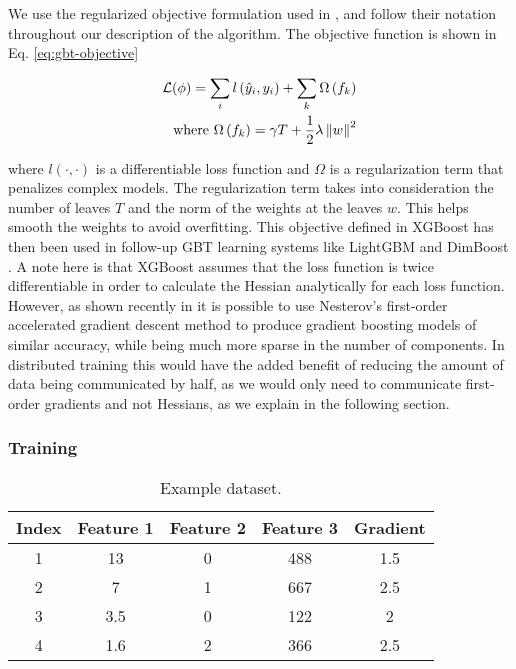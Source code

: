 We use the
regularized objective formulation used
in \cite{xgboost}, and follow their notation throughout our description of the algorithm.
The objective function is shown in Eq. \ref{eq:gbt-objective}

\begin{equation}
	\begin{split}
	\mathcal{L}(\phi) = \sum_{i} l\left(\hat{y}_{i},y_{i}\right) + \sum_{k} \Omega\left(f_{k}\right) \\
	\text{where } \Omega\left(f_{k}\right) = \gamma T + \frac{1}{2} \lambda \left\lVert w\right\rVert^2
	\end{split}
	\label{eq:gbt-objective}
\end{equation}

\noindent
where $l(\cdot, \cdot)$ is a differentiable loss function and $\Omega$ is a regularization term
that penalizes complex models. The regularization term takes into consideration
the number of leaves $T$ and the norm of the weights at the leaves $w$. This helps
smooth the weights to avoid overfitting. This objective defined in XGBoost
has then been used in follow-up GBT learning systems like LightGBM and
DimBoost \cite{lightgbm, dimboost}.  A note here is that XGBoost
assumes that the loss function is twice differentiable in order
to calculate the Hessian analytically for each loss function.
However, as shown recently in \cite{accelerated-gb} it is possible
to use Nesterov's first-order accelerated gradient descent method
\cite{nesterov-book} to produce gradient boosting models of similar
accuracy, while being much more sparse in the number of components.
In distributed training this would have the added benefit of reducing
the amount of data being communicated by half, as we would only need to
communicate first-order gradients and not Hessians, as we explain
in the following section.



\subsubsection*{Training}

\begin{table}
	\centering
	\begin{tabular}{cccc|c}
		\toprule
		Index & Feature 1 & Feature 2 & Feature 3 & Gradient \\
		\midrule
		\rowcolor{CBOne}
		1 & 13 & 0 & 488 & 1.5 \\
		\rowcolor{CBTwo}
		2 & 7 & 1 & 667 & 2.5 \\
		\rowcolor{CBThree}
		3 & 3.5 & 0 & 122 & 2 \\
		\rowcolor{CBFour}
		4 & 1.6 & 2 & 366 & 2.5 \\
		\bottomrule
	\end{tabular}
	\caption{Example dataset.}
	\label{tab:example-data}
\end{table}


